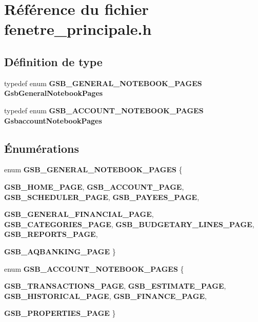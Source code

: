 \section{Référence du fichier fenetre\_\-principale.h}
\label{fenetre__principale_8h}
\subsection*{Définition de type}
\begin{DoxyCompactItemize}
\item 
typedef enum {\bf GSB\_\-GENERAL\_\-NOTEBOOK\_\-PAGES} {\bf GsbGeneralNotebookPages}
\item 
typedef enum {\bf GSB\_\-ACCOUNT\_\-NOTEBOOK\_\-PAGES} {\bf GsbaccountNotebookPages}
\end{DoxyCompactItemize}
\subsection*{Énumérations}
\begin{DoxyCompactItemize}
\item 
enum {\bf GSB\_\-GENERAL\_\-NOTEBOOK\_\-PAGES} \{ \par
{\bf GSB\_\-HOME\_\-PAGE}, 
{\bf GSB\_\-ACCOUNT\_\-PAGE}, 
{\bf GSB\_\-SCHEDULER\_\-PAGE}, 
{\bf GSB\_\-PAYEES\_\-PAGE}, 
\par
{\bf GSB\_\-GENERAL\_\-FINANCIAL\_\-PAGE}, 
{\bf GSB\_\-CATEGORIES\_\-PAGE}, 
{\bf GSB\_\-BUDGETARY\_\-LINES\_\-PAGE}, 
{\bf GSB\_\-REPORTS\_\-PAGE}, 
\par
{\bf GSB\_\-AQBANKING\_\-PAGE}
 \}
\item 
enum {\bf GSB\_\-ACCOUNT\_\-NOTEBOOK\_\-PAGES} \{ \par
{\bf GSB\_\-TRANSACTIONS\_\-PAGE}, 
{\bf GSB\_\-ESTIMATE\_\-PAGE}, 
{\bf GSB\_\-HISTORICAL\_\-PAGE}, 
{\bf GSB\_\-FINANCE\_\-PAGE}, 
\par
{\bf GSB\_\-PROPERTIES\_\-PAGE}
 \}
\end{DoxyCompactItemize}

